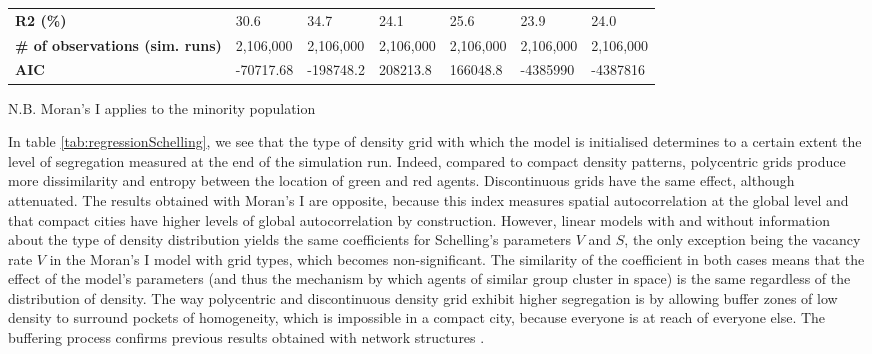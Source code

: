 \documentclass[3p,times,procedia]{elsarticle}
\begin{document}
\begin{table}[]
\begin{adjustwidth}{-1cm}{-1cm}
\begin{tabular}{|m{2.5cm}|ll|ll|ll|}
\textbf{R2 (\%)}                            & 30.6       & 34.7                             & 24.1              & 25.6              & 23.9                 & 24.0                    \\ 
\textbf{\# of observations (sim. runs)}     & 2,106,000  & 2,106,000 						 & 2,106,000          & 2,106,000          & 2,106,000             & 2,106,000                \\ 
\textbf{AIC}                                & -70717.68   & -198748.2  						& 208213.8          & 166048.8          & -4385990             & -4387816                 \\ \hline
\end{tabular}
\end{adjustwidth}
N.B. Moran's I applies to the minority population
\end{table}

In table \ref{tab:regressionSchelling}, we see that the type of density grid with which the model is initialised determines to a certain extent the level of segregation measured at the end of the simulation run. Indeed, compared to compact density patterns, polycentric grids produce more dissimilarity and entropy between the location of green and red agents. Discontinuous grids have the same effect, although attenuated. The results obtained with Moran's I are opposite, because this index measures spatial autocorrelation at the global level and that compact cities have higher levels of global autocorrelation by construction. However, linear models with and without information about the type of density distribution yields the same coefficients for Schelling's parameters $V$ and $S$, the only exception being the vacancy rate $V$ in the Moran's I model with grid types, which becomes non-significant. The similarity of the coefficient in both cases means that the effect of the model's parameters (and thus the mechanism by which agents of similar group cluster in space) is the same regardless of the distribution of density. The way polycentric and discontinuous density grid exhibit higher segregation is by allowing buffer zones of low density to surround pockets of homogeneity, which is impossible in a compact city, because everyone is at reach of everyone else. The buffering process confirms previous results obtained with network structures \citep{Banos2012}.
\end{document}
